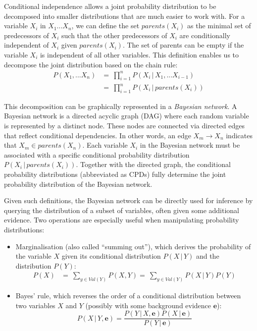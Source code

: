 Conditional independence allows a joint probability distribution to be decomposed into smaller distributions that are much easier to work with.  For a variable $X_i$ in $ X_1...X_n$, we can define the set $parents(X_i)$ as the minimal set of predecessors of $X_i$ such that the other predecessors of $X_i$ are conditionally independent of $X_i$ given $parents(X_i)$.  The set of parents can be empty if the variable $X_i$ is independent of all other variables. This definition enables us to decompose the joint distribution based on the chain rule:
\begin{align}
P(X_1,...X_n) & = \ \prod_{i=1}^n P(X_i  \, | \,  X_1, ... X_{i-1}) \\
&= \ \prod_{i=1}^n P(X_i  \, | \,  parents(X_i)) 
\end{align}

This decomposition can be graphically represented in a \textit{Bayesian network}.  A Bayesian network is a directed acyclic graph (DAG) where each random variable is represented by a distinct node.  These nodes are connected via directed edges that reflect conditional dependencies. In other words, an edge $X_m \rightarrow X_n$ indicates that $X_m \in parents(X_n)$. Each variable $X_i$ in the Bayesian network must be associated with a specific conditional probability distribution $P(X_i  \, | \,  parents(X_i))$.   Together with the directed graph, the conditional probability distributions (abbreviated as CPDs) fully determine the joint probability distribution of the Bayesian network.   

Given such definitions, the Bayesian network can be directly used for inference by querying the distribution of a subset of variables, often given some additional evidence. Two operations are especially useful when manipulating probability distributions: 
\begin{itemize}
\item Marginalisation (also called ``summing out''), which derives the probability of the variable $X$ given its conditional distribution $P(X \, | \, Y)$ and the distribution $P(Y)$: 
\begin{align}
P(X) & = \ \sum_{y \in Val(Y)} P(X,Y) = \ \sum_{y \in Val(Y)} P(X \, | \, Y) P(Y)
\end{align}
\item Bayes' rule, which reverses the order of a conditional distribution between two variables $X$ and $Y$ (possibly with some background evidence $\mathbf{e}$): 
\begin{equation}
P(X \, | \, Y, \mathbf{e}) = \frac{P(Y \, | \, X, \mathbf{e}) P(X \, | \, \mathbf{e})} {P(Y \, | \, \mathbf{e})} \label{eq:genbayes}
\end{equation}
\end{itemize}

